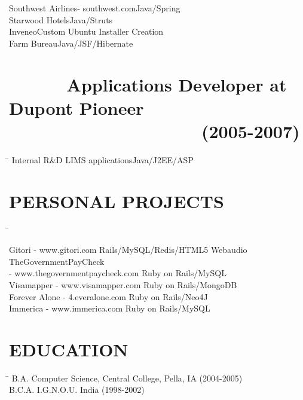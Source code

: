 \documentclass{res}
\begin{document}
\begin{resume}
\begin{tabbing}
Southwest Airlines- southwest.com\>Java/Spring \\

Starwood Hotels\>Java/Struts\\

Inveneo\>Custom Ubuntu Installer Creation\\

Farm Bureau\>Java/JSF/Hibernate \\
 \end{tabbing}
\vspace{-0.4in}
\section {\ \ \ \ \ \ Applications Developer at Dupont Pioneer \textnormal{\ \ \ \ \ \ \ \ \ \ \ \  \ \ \ \ \ \ \ \ (2005-2007)}}\vspace{0.05in}
   \begin{tabbing}
   \hspace{3.3in}\= \kill %
Internal R\&D LIMS applications\>Java/J2EE/ASP\\
\end{tabbing}
\vspace{0.1in}         
\section{PERSONAL PROJECTS}  \vspace{-0.01in}   
   \begin{tabbing}
   \hspace{3.3in}\= \kill %

    Gitori - www.gitori.com   \>Rails/MySQL/Redis/HTML5 Webaudio \\

    TheGovernmentPayCheck \\- www.thegovernmentpaycheck.com   \>Ruby on Rails/MySQL\\

    Visamapper - www.visamapper.com   \>Ruby on Rails/MongoDB \\
 
    Forever Alone - 4.everalone.com \>Ruby on Rails/Neo4J \\

    Immerica - www.immerica.com \>Ruby on Rails/MySQL\\

\end{tabbing}

\section{EDUCATION}\vspace{0.05in}
\begin{tabbing}
\hspace{3.3in}\= \kill %
        B.A. Computer Science, Central College, Pella, IA  \>(2004-2005) \\
        B.C.A. I.G.N.O.U. India  \>(1998-2002) \\
\end{tabbing}
\vspace{-0.2in}

\end{resume}
\end{document}
